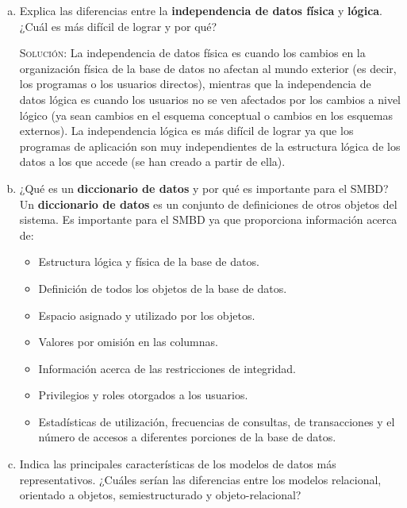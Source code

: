 \documentclass[letterpaper,12pt]{article}
\begin{document}
\begin{enumerate}[a. ]
            \item Explica las diferencias entre la \textbf{independencia de datos física} y \textbf{lógica}. ¿Cuál es más difícil de lograr y por qué?

            \textsc{Solución:} La independencia de datos física es cuando los cambios en la organización física de la base de datos no afectan al mundo exterior (es decir, los programas o los usuarios directos), mientras que la independencia de datos lógica es cuando los usuarios no se ven afectados por los cambios a nivel lógico (ya sean cambios en el esquema conceptual o cambios en los esquemas externos). La independencia lógica es más difícil de lograr ya que los programas de aplicación son muy independientes de la estructura lógica de los datos a los que accede (se han creado a partir de ella).

            \item ¿Qué es un \textbf{diccionario de datos} y por qué es importante para el SMBD? \\
            
            Un \textbf{diccionario de datos} es un conjunto de definiciones de otros objetos del sistema. Es importante para el SMBD ya que proporciona información acerca de:
            \begin{itemize}
              \item Estructura lógica y física de la base de datos.
              \item Definición de todos los objetos de la base de datos. 
              \item Espacio asignado y utilizado por los objetos.
              \item Valores por omisión en las columnas.
              \item Información acerca de las restricciones de integridad.
              \item Privilegios y roles otorgados a los usuarios.
              \item Estadísticas de utilización, frecuencias de consultas, de transacciones y el número de accesos a diferentes porciones de la base de datos.
            \end{itemize}

            \item Indica las principales características de los modelos de datos más representativos. ¿Cuáles serían las
            diferencias entre los modelos relacional, orientado a objetos, semiestructurado y objeto-relacional? \\
          \begin{itemize}


\end{itemize}
\end{enumerate}
\end{document}
